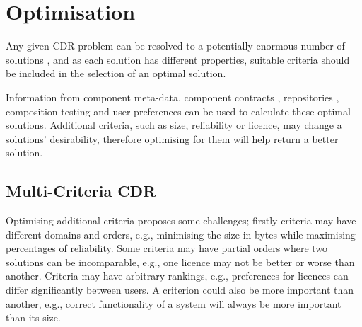 

\section{Optimisation}
Any given CDR problem can be resolved to a potentially enormous number of solutions \cite{Jenson2010},
and as each solution has different properties, suitable criteria should be included in the selection of an optimal solution.

Information from component meta-data, component contracts \cite{Watkins1999}, repositories \cite{Guo2000}, 
composition testing \cite{XuejieZhang2008} and user preferences can be used to calculate these optimal solutions.
Additional criteria, such as size, reliability or licence, may change a solutions' desirability, 
therefore optimising for them will help return a better solution.


\subsection{Multi-Criteria CDR}
Optimising additional criteria proposes some challenges; firstly criteria may have different domains and orders, 
e.g., minimising the size in bytes while maximising percentages of reliability. 
Some criteria may have partial orders where two solutions can be incomparable,
e.g., one licence may not be better or worse than another.
Criteria may have arbitrary rankings, 
e.g., preferences for licences can differ significantly between users.
A criterion could also be more important than another, 
e.g., correct functionality of a system will always be more important than its size.

